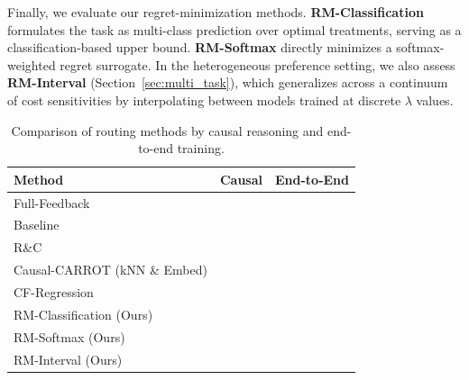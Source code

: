 \documentclass{article}
\newcommand{\cmark}{\textcolor{green!60!black}{\ding{51}}} %
\newcommand{\xmark}{\textcolor{red!70!black}{\ding{55}}}   %
\theoremstyle{remark}
\begin{document}


Finally, we evaluate our regret-minimization methods. \textbf{RM-Classification} formulates the task as multi-class prediction over optimal treatments, serving as a classification-based upper bound. \textbf{RM-Softmax} directly minimizes a softmax-weighted regret surrogate. In the heterogeneous preference setting, we also assess \textbf{RM-Interval} (Section~\ref{sec:multi_task}), which generalizes across a continuum of cost sensitivities by interpolating between models trained at discrete \( \lambda \) values.





\begin{table}[h]
\centering
\caption{Comparison of routing methods by causal reasoning and end-to-end training.}
\label{tab:causal_end2end}
\begin{tabular}{lcc}
\toprule
\textbf{Method} & \textbf{Causal} & \textbf{End-to-End} \\
\midrule
Full-Feedback     & \cmark & \cmark \\ \hdashline
Baseline      & \xmark & \xmark \\
R\&C  & \cmark & \xmark \\
 
Causal-CARROT (kNN \& Embed)             & \cmark & \xmark \\
CF-Regression         & \cmark & \xmark \\ \hdashline
RM-Classification (Ours)    & \cmark & \cmark \\
RM-Softmax (Ours)            & \cmark & \cmark \\
RM-Interval  (Ours)     & \cmark & \cmark \\
\bottomrule
\end{tabular}
\end{table}
\end{document}
